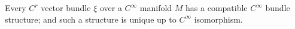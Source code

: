 Every $C^r$ vector bundle $\xi$ over a $C^\infty$ manifold $M$ has a compatible $C^\infty$ bundle structure; and such a structure is unique up to $C^\infty$ isomorphism.
